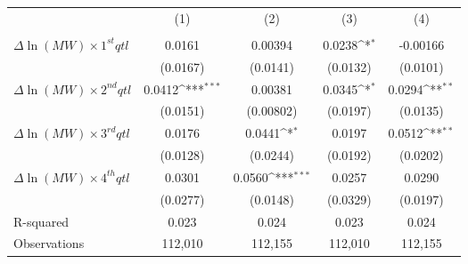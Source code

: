 {
\def\sym#1{\ifmmode^{#1}\else\(^{#1}\)\fi}
\begin{tabular}{l*{4}{c}}
\hline\hline
          &&&&\\
          &&&&\\
\hline
$\Delta \ln(MW) \times 1^{st} qtl$&   0.0161         &  0.00394         &   0.0238\sym{*}  & -0.00166         \\
          & (0.0167)         & (0.0141)         & (0.0132)         & (0.0101)         \\
[1em]
$\Delta \ln(MW) \times 2^{nd} qtl$&   0.0412\sym{***}&  0.00381         &   0.0345\sym{*}  &   0.0294\sym{**} \\
          & (0.0151)         &(0.00802)         & (0.0197)         & (0.0135)         \\
[1em]
$\Delta \ln(MW) \times 3^{rd} qtl$&   0.0176         &   0.0441\sym{*}  &   0.0197         &   0.0512\sym{**} \\
          & (0.0128)         & (0.0244)         & (0.0192)         & (0.0202)         \\
[1em]
$\Delta \ln(MW) \times 4^{th} qtl$&   0.0301         &   0.0560\sym{***}&   0.0257         &   0.0290         \\
          & (0.0277)         & (0.0148)         & (0.0329)         & (0.0197)         \\
\hline
R-squared &    0.023         &    0.024         &    0.023         &    0.024         \\
Observations&  112,010         &  112,155         &  112,010         &  112,155         \\
\hline\hline
\end{tabular}
}
